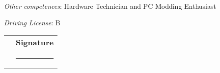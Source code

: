 \documentclass[a4paper, 10pt]{article}
\begin{document}
\skillListStart
\justifying
\item \emph{Other competences}: Hardware Technician and PC Modding Enthusiast
\item \emph{Driving License}: B
\skillListEnd

\vspace{1cm}


\begin{tabularx}{\textwidth}{>{\centering\arraybackslash}X >{\centering\arraybackslash}X}
	{\textbf{Date}} &
	{\textbf{Signature}} \\[0.3cm]
	\rule{4cm}{0.3pt} & \rule{4cm}{0.3pt} \\[-0.1cm]
\end{tabularx}
\end{document}
